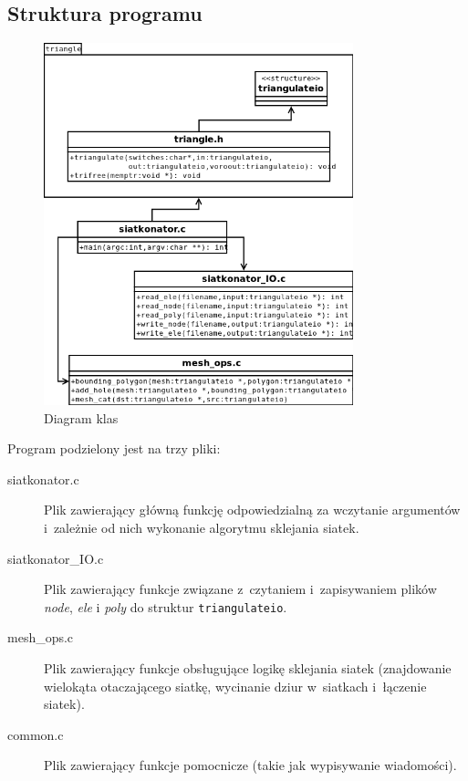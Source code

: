 \documentclass[a4paper]{article}
\begin{document}
\subsection{Struktura programu}

\begin{figure}[h]
  \centering
  \includegraphics[width=0.8\textwidth]{class.png}
  \caption{Diagram klas}
\end{figure}

  Program podzielony jest na trzy pliki:
  \begin{description}
    \item[siatkonator.c] Plik zawierający główną funkcję odpowiedzialną za wczytanie argumentów i~zależnie od nich wykonanie algorytmu sklejania siatek.
    \item[siatkonator\_IO.c] Plik zawierający funkcje związane z~czytaniem i~zapisywaniem plików \emph{node}, \emph{ele} i \emph{poly} do struktur \texttt{triangulateio}.
    \item[mesh\_ops.c] Plik zawierający funkcje obsługujące logikę sklejania siatek (znajdowanie wielokąta otaczającego siatkę, wycinanie dziur w~siatkach i~łączenie siatek).
    \item[common.c] Plik zawierający funkcje pomocnicze (takie jak wypisywanie wiadomości).
  \end{description}
\end{document}
